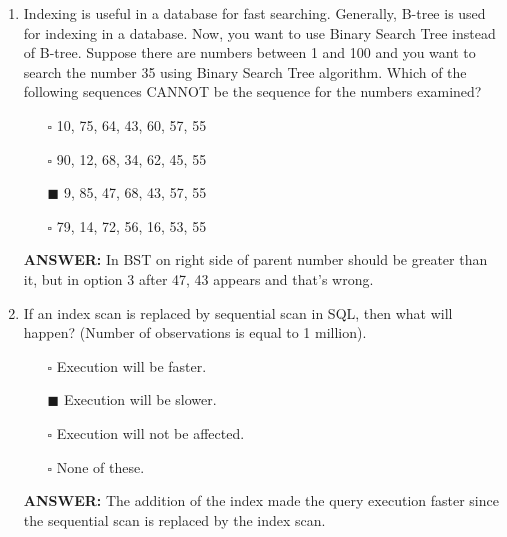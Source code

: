 \documentclass[10pt]{article}
\begin{document}
\begin{enumerate}
		\item Indexing is useful in a database for fast searching. Generally, B-tree is used for indexing in a database. Now, you want to use Binary Search Tree instead of B-tree. Suppose there are numbers between 1 and 100 and you want to search the number 35 using Binary Search Tree algorithm. Which of the following sequences CANNOT be the sequence for the numbers examined?
			\begin{enumerate}
				\item[$\square$] 10, 75, 64, 43, 60, 57, 55
				\item[$\square$] 90, 12, 68, 34, 62, 45, 55
				\item[$\blacksquare$] 9, 85, 47, 68, 43, 57, 55
				\item[$\square$] 79, 14, 72, 56, 16, 53, 55
			\end{enumerate}
			\color{red} \textbf{ANSWER:} \color{black} In BST on right side of parent number should be greater than it, but in option 3 after 47, 43 appears and that's wrong.
		
		\item If an index scan is replaced by sequential scan in SQL, then what will happen? (Number of observations is equal to 1 million).
			\begin{enumerate}
				\item[$\square$] Execution will be faster.
				\item[$\blacksquare$] Execution will be slower.
				\item[$\square$] Execution will not be affected.
				\item[$\square$] None of these.
			\end{enumerate}
			\color{red} \textbf{ANSWER:} \color{black} The addition of the index made the query execution faster since the sequential scan is replaced by the index scan.


\end{enumerate}
\end{document}
